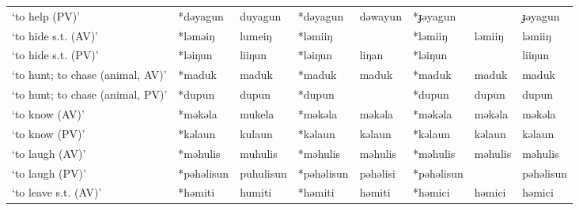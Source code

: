 \begin{landscape}
\begin{longtable}[c]{@{}p{3cm}<{\raggedright}p{2.75cm}<{\raggedright}p{2.75cm}<{\raggedright}p{2.75cm}<{\raggedright}p{2.75cm}<{\raggedright}p{2.75cm}<{\raggedright}p{2.75cm}<{\raggedright}p{2.75cm}<{\raggedright}@{}}
`to help (PV)'                                       & *dəyagun           & duyagun                        & *dəyagun           & dəwayun                    & *ɟəyagun         &                          & ɟəyagun                           \\
`to hide s.t. (AV)'                                  & *ləməiŋ            & lumeiŋ                         & *ləmiiŋ            &                            & *ləmiiŋ          & ləmiiŋ                   & ləmiiŋ                            \\
`to hide s.t. (PV)'                                  & *ləiŋun            & liiŋun                         & *ləiŋun            & liŋan                      & *ləiŋun          &                          & liiŋun                            \\
`to hunt; to chase (animal, AV)'                     & *maduk             & maduk                          & *maduk             & maduk                      & *maduk           & maduk                    & maduk                             \\
`to hunt; to chase (animal, PV)'                     & *dupun             & dupun                          & *dupun             &                            & *dupun           & dupun                    & dupun                             \\
`to know (AV)'                                       & *məkəla            & mukela                         & *məkəla            & məkəla                     & *məkəla          & məkəla                   & məkəla                            \\
`to know (PV)'                                       & *kəlaun            & kulaun                         & *kəlaun            & kəlaun                     & *kəlaun          & kəlaun                   & kəlaun                            \\
`to laugh (AV)'                                      & *məhulis           & muhulis                        & *məhulis           & məhulis                    & *məhulis         & məhulis                  & məhulis                           \\
`to laugh (PV)'                                      & *pəhəlisun         & puhulisun                      & *pəhəlisun         & pəhəlisi                   & *pəhəlisun       &                          & pəhəlisun                         \\
`to leave s.t. (AV)'                                 & *həmiti            & humiti                         & *həmiti            & həmiti                     & *həmici          & həmici                   & həmici                            \\

\end{longtable}
\end{landscape}
